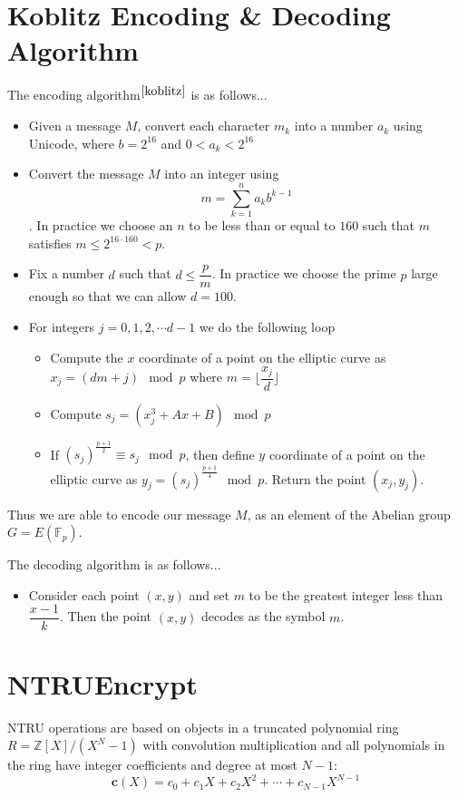 \documentclass[a4paper,12pt]{article}
\begin{document}
\section{Koblitz Encoding \& Decoding Algorithm}
\begin{flushleft}
	The encoding algorithm$^{\cite{koblitz}}$ is as follows...\\
	\begin{itemize}
		\item Given a message $M$, convert each character $m_k$ into a number $a_k$ using Unicode, where $b=2^{16}$ and $0<a_k<2^{16}$
		\item Convert the message $M$ into an integer using $$m=\sum_{k=1}^n a_kb^{k-1}$$. In practice we choose an $n$ to be less than or equal to $160$ such that $m$ satisfies $m\le 2^{16\cdot 160}<p$.
		\item Fix a number $d$ such that $d\le \dfrac{p}{m}$. In practice we choose the prime $p$ large enough so that we can allow $d=100$.
		\item For integers $j=0,1,2,\cdots d-1$  we do the following loop
		\begin{itemize}
			\item Compute the $x$ coordinate of a point on the elliptic curve as $x_j=(dm+j)\mod p$ where $m=\bigg\lfloor{\dfrac{x_j}{d}}\bigg\rfloor$
			\item Compute $s_j=(x_j^3+Ax+B)\mod p$
			\item If $\left(s_j\right)^{\frac{p+1}{2}}\equiv s_j\mod p$, then define $y$ coordinate of a point on the elliptic curve as $y_j=\left(s_j\right)^{\frac{p+1}{4}}\mod p$. Return the point $(x_j,y_j)$.
		\end{itemize}
	\end{itemize}
	
	Thus we are able to encode our message $M$, as an element of the Abelian group $G=E\left(\mathbb{F}_p\right)$.
	
	The decoding algorithm is as follows...\\
	\begin{itemize}
	    \item Consider each point $(x,y)$ and set $m$ to be the greatest integer less than $\dfrac{x-1}k$. Then the point $(x,y)$ decodes as the symbol $m$. 
	\end{itemize}
\end{flushleft}

\section{NTRUEncrypt}
NTRU operations are based on objects in a truncated polynomial ring $R=\mathbb{Z}[X]/(X^N-1)$ with convolution multiplication and all polynomials in the ring have integer coefficients and degree at most $N-1$:
\begin{equation}
    \textbf{c}(X)=c_0+c_1X+c_2X^2+\cdots+c_{N-1}X^{N-1}
\end{equation}
\end{document}
